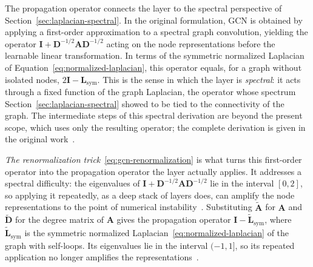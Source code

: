 The propagation operator connects the layer to the spectral perspective of
Section~\ref{sec:laplacian-spectral}. In the original formulation, GCN is obtained
by applying a first-order approximation to a spectral graph convolution,
yielding the operator $\mathbf{I} + \mathbf{D}^{-1/2}\mathbf{A}\mathbf{D}^{-1/2}$
acting on the node representations before the learnable linear transformation. In
terms of the symmetric normalized Laplacian of
Equation~\eqref{eq:normalized-laplacian}, this operator equals, for a graph without
isolated nodes, $2\mathbf{I} - \mathbf{L}_{\mathrm{sym}}$. This is the sense in which the layer is
\textit{spectral}: it acts through a fixed function of the graph Laplacian, the operator 
whose spectrum Section~\ref{sec:laplacian-spectral} showed to be tied to the connectivity of the
graph. The intermediate steps of this spectral derivation are beyond the present
scope, which uses only the resulting operator; the complete derivation is given in
the original work~\cite[-5pc]{kipf2017}.
 
\textit{The renormalization trick}~\eqref{eq:gcn-renormalization} is what turns this
first-order operator into the propagation operator the layer actually applies. It
addresses a spectral difficulty: the eigenvalues of
$\mathbf{I} + \mathbf{D}^{-1/2}\mathbf{A}\mathbf{D}^{-1/2}$ lie in the interval
$[0, 2]$, so applying it repeatedly, as a deep stack of layers does,
can amplify the node representations to the point of numerical instability~\cite{kipf2017}.
Substituting $\tilde{\mathbf{A}}$ for $\mathbf{A}$ and $\tilde{\mathbf{D}}$ for
the degree matrix of $\mathbf{A}$ gives the propagation operator
$\mathbf{I} - \tilde{\mathbf{L}}_{\mathrm{sym}}$, where
$\tilde{\mathbf{L}}_{\mathrm{sym}}$ is the symmetric normalized
Laplacian~\eqref{eq:normalized-laplacian} of the graph with self-loops. Its
eigenvalues lie in the interval $(-1, 1]$, so its repeated application no
longer amplifies the representations~\cite[1pc]{wu2019}.
 
